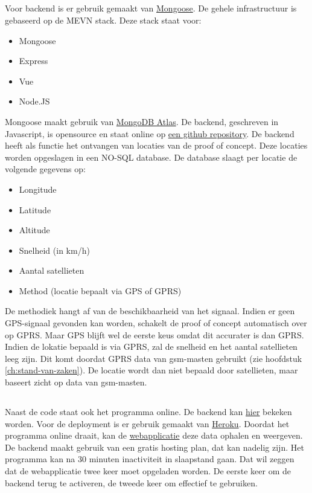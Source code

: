 \subsection{}
Voor backend is er gebruik gemaakt van \href{https://mongoosejs.com/}{Mongoose}. De gehele infrastructuur is gebaseerd op de MEVN stack.
Deze stack staat voor:
\begin{itemize}
	\item Mongoose
	\item Express
	\item Vue
	\item Node.JS
\end{itemize}
Mongoose maakt gebruik van \href{https://www.mongodb.com/cloud/atlas}{MongoDB Atlas}. De backend, geschreven in Javascript, is opensource en staat online op \underline{\href{https://github.com/IndyVC/bap-backend}{een github repository}}.
\newline
De backend heeft als functie het ontvangen van locaties van de proof of concept. Deze locaties worden opgeslagen in een NO-SQL database. De database slaagt per locatie de volgende gegevens op:
\begin{itemize}
	\item Longitude
	\item Latitude
	\item Altitude
	\item Snelheid (in km/h)
	\item Aantal satellieten
	\item Method (locatie bepaalt via GPS of GPRS)
\end{itemize}
De methodiek hangt af van de beschikbaarheid van het signaal. Indien er geen GPS-signaal gevonden kan worden, schakelt de proof of concept automatisch over op GPRS. Maar GPS blijft wel de eerste keus omdat dit accurater is dan GPRS. Indien de lokatie bepaald is via GPRS, zal de snelheid en het aantal satellieten leeg zijn. Dit komt doordat GPRS data van gsm-masten gebruikt (zie hoofdstuk \ref{ch:stand-van-zaken}). De locatie wordt dan niet bepaald door satellieten, maar baseert zicht op data van gsm-masten. 

\subsection{}
Naast de code staat ook het programma online. De backend kan \href{https://indy-bap-backend.herokuapp.com/api/locations}{\underline{hier}} bekeken worden. Voor de deployment is er gebruik gemaakt van \href{www.heroku.com}{Heroku}. Doordat het programma online draait, kan de \href{https://indy-bap-frontend.netlify.com/}{webapplicatie} deze data ophalen en weergeven.
\newline
De backend maakt gebruik van een gratis hosting plan, dat kan nadelig zijn. Het programma kan na 30 minuten inactiviteit in slaapstand gaan. Dat wil zeggen dat de webapplicatie twee keer moet opgeladen worden. De eerste keer om de backend terug te activeren, de tweede keer om effectief te gebruiken.
\pagebreak
